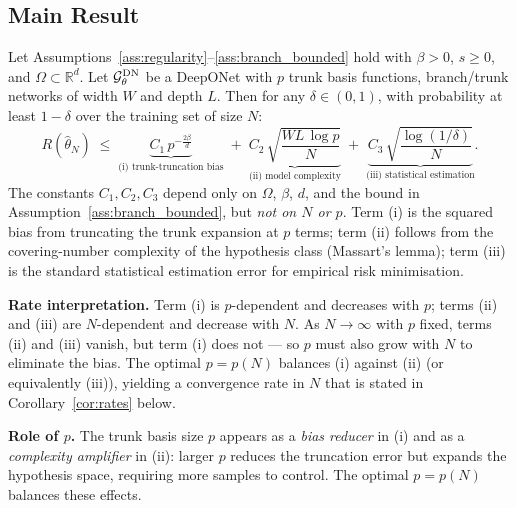 \documentclass[12pt,a4paper]{article}
\def\reals{{\mathbb R}}
\begin{document}
\subsection{Main Result}

\begin{theo}
    \label{theo:deeponet}
    Let Assumptions~\ref{ass:regularity}--\ref{ass:branch_bounded} hold with
    $\beta > 0$, $s \geq 0$, and $\Omega \subset \reals^d$.
    Let $\mathcal{G}_\theta^{\rm DN}$ be a DeepONet with $p$ trunk basis functions,
    branch/trunk networks of width $W$ and depth $L$.
    Then for any $\delta \in (0,1)$, with probability at least $1-\delta$
    over the training set of size $N$:
    \begin{equation}
        R(\hat\theta_N)
        \;\leq\;
        \underbrace{C_1\,p^{-\frac{2\beta}{d}}}_{\text{(i) trunk-truncation bias}}
        \;+\;
        \underbrace{C_2\,\sqrt{\frac{WL\,\log p}{N}}}_{\text{(ii) model complexity}}
        \;+\;
        \underbrace{C_3\,\sqrt{\frac{\log(1/\delta)}{N}}}_{\text{(iii) statistical estimation}}.
        \label{eq:deeponet_bound}
    \end{equation}
    The constants $C_1, C_2, C_3$ depend only on $\Omega$, $\beta$, $d$, and
    the bound in Assumption~\ref{ass:branch_bounded}, but \emph{not on $N$ or $p$}.
    Term (i) is the squared bias from truncating the trunk expansion at $p$ terms;
    term (ii) follows from the covering-number complexity of the hypothesis class
    (Massart's lemma); term (iii) is the standard statistical estimation error
    for empirical risk minimisation.
\end{theo}

\textbf{Rate interpretation.}  Term (i) is $p$-dependent and decreases with $p$;
terms (ii) and (iii) are $N$-dependent and decrease with $N$.
As $N\to\infty$ with $p$ fixed, terms (ii) and (iii) vanish, but term (i)
does not --- so $p$ must also grow with $N$ to eliminate the bias.
The optimal $p = p(N)$ balances (i) against (ii) (or equivalently (iii)),
yielding a convergence rate in $N$ that is stated in
Corollary~\ref{cor:rates} below.

\textbf{Role of $p$.}  The trunk basis size $p$ appears as a
\textit{bias reducer} in (i) and as a \textit{complexity amplifier} in (ii):
larger $p$ reduces the truncation error but expands the hypothesis space,
requiring more samples to control.  The optimal $p = p(N)$ balances these
effects.
\end{document}
